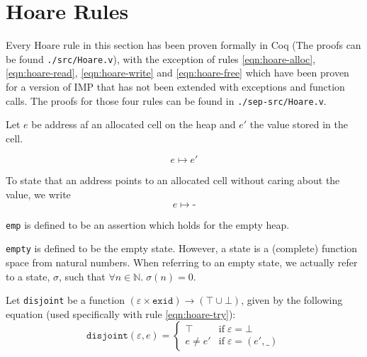 
\section{Hoare Rules}

Every Hoare rule in this section has been proven formally in Coq (The proofs can be found \verb|./src/Hoare.v|), with the exception of rules \ref{eqn:hoare-alloc}, \ref{eqn:hoare-read}, \ref{eqn:hoare-write} and \ref{eqn:hoare-free} which have been proven for a version of IMP that has not been extended with exceptions and function calls. The proofs for those four rules can be found in \verb|./sep-src/Hoare.v|.

\begin{defn}

Let $e$ be address af an allocated cell on the heap and $e'$ the value stored in the cell.

\begin{equation}
e \mapsto e'
\end{equation}

To state that an address points to an allocated cell without caring about the value, we write
\begin{equation}
e \mapsto \textbf{-}
\end{equation}

\end{defn}

\begin{defn}
\verb|emp| is defined to be an assertion which holds for the empty heap.
\end{defn}

\begin{defn}
\verb|empty| is defined to be the empty state. However, a state is a (complete) function space from natural numbers. When referring to an empty state, we actually refer to a state, $\sigma$, such that $\forall n \in \mathbb{N}.\; \sigma(n) = 0$.
\end{defn}

\begin{defn}
Let \verb|disjoint| be a function $(\varepsilon\times\texttt{exid})\rightarrow(\top\cup\bot)$, given by the following equation (used specifically with rule \ref{eqn:hoare-try}):
\begin{equation}
\texttt{disjoint}(\varepsilon, e) = \begin{cases}
\top & \mbox{if} \; \varepsilon = \bot \\
e \neq e' & \mbox{if} \; \varepsilon = (e', \_)
\end{cases}
\end{equation}
\end{defn}

